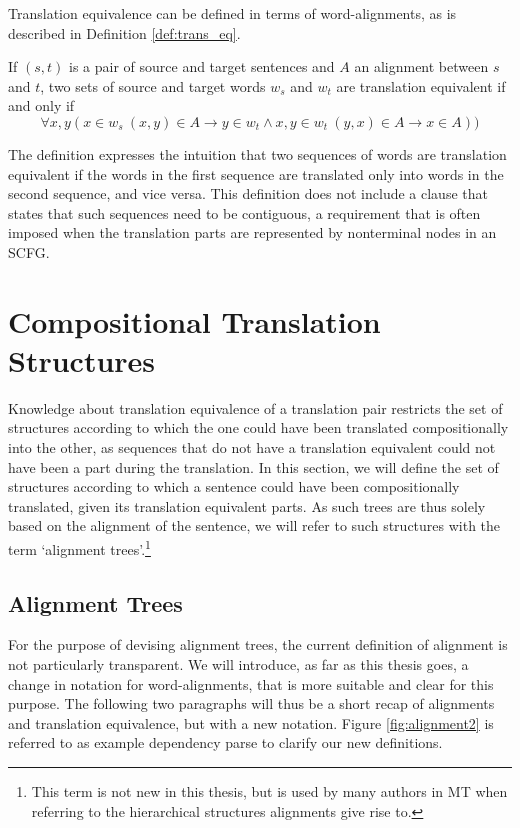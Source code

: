 Translation equivalence can be defined in terms of word-alignments, as is described in Definition \ref{def:trans_eq}.

\begin{definition}\label{def:trans_eq}
If $(s,t)$ is a pair of source and target sentences and $A$ an alignment between $s$ and $t$, two sets of source and target words $w_s$ and $w_t$ are translation equivalent if and only if $$\forall x,y ( x\in w_s~(x,y)\in A \rightarrow y\in w_t \land x,y \in w_t~(y,x)\in A \rightarrow x\in A))$$
\end{definition}

The definition expresses the intuition that two sequences of words are translation equivalent if the words in the first sequence are translated only into words in the second sequence, and vice versa. This definition does not include a clause that states that such sequences need to be contiguous, a requirement that is often imposed when the translation parts are represented by nonterminal nodes in an SCFG.

\section{Compositional Translation Structures}
\label{sec:comp_structures}

Knowledge about translation equivalence of a translation pair restricts the set of structures according to which the one could have been translated compositionally into the other, as sequences that do not have a translation equivalent could not have been a part during the translation. In this section, we will define the set of structures according to which a sentence could have been compositionally translated, given its translation equivalent parts. As such trees are thus solely based on the alignment of the sentence, we will refer to such structures with the term  `alignment trees'.\footnote{This term is not new in this thesis, but is used by many authors in MT when referring to the hierarchical structures alignments give rise to.}

\subsection{Alignment Trees}
\label{subsec:alignment_trees}

For the purpose of devising alignment trees, the current definition of alignment is not particularly transparent. We will introduce, as far as this thesis goes, a change in notation for word-alignments, that is more suitable and clear for this purpose. The following two paragraphs will thus be a short recap of alignments and translation equivalence, but with a new notation. Figure \ref{fig:alignment2} is referred to as example dependency parse to clarify our new definitions.


